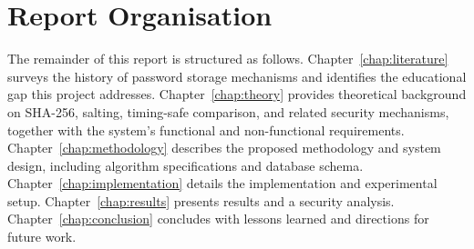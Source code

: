 \section{Report Organisation}
\label{sec:intro_organisation}

The remainder of this report is structured as follows. Chapter~\ref{chap:literature} surveys the history of password storage mechanisms and identifies the educational gap this project addresses. Chapter~\ref{chap:theory} provides theoretical background on SHA-256, salting, timing-safe comparison, and related security mechanisms, together with the system's functional and non-functional requirements. Chapter~\ref{chap:methodology} describes the proposed methodology and system design, including algorithm specifications and database schema. Chapter~\ref{chap:implementation} details the implementation and experimental setup. Chapter~\ref{chap:results} presents results and a security analysis. Chapter~\ref{chap:conclusion} concludes with lessons learned and directions for future work.
